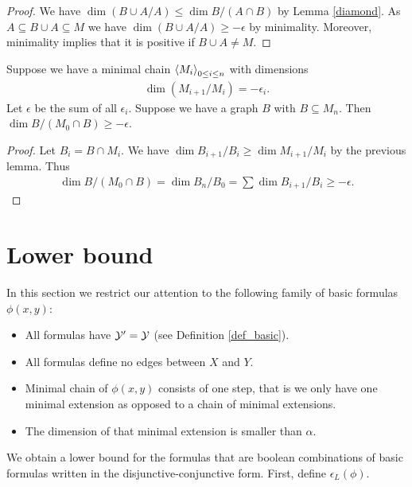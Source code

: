 \documentclass{amsart}
\begin{document}
\begin{proof}
  We have $\dim (B \cup A / A) \leq \dim B / (A \cap B)$ by Lemma \ref{diamond}.
  As $A \subseteq B \cup A \subseteq M$ we have $\dim (B \cup A / A) \geq -\epsilon$ by minimality.
  Moreover, minimality implies that it is positive if $B \cup A \neq M$.
\end{proof}

\begin{Lemma} \label{chain_intersect}
  Suppose we have a minimal chain  $\left\langle M_i \right\rangle_{0 \leq i \leq n}$ with dimensions
  \begin{align*}
    \dim(M_{i+1}/M_i) = -\epsilon_i.
  \end{align*}
  Let $\epsilon$ be the sum of all $\epsilon_i$.
  Suppose we have a graph $B$ with $B \subseteq M_n$.
  Then $\dim B / (M_0 \cap B) \geq -\epsilon$.
\end{Lemma}

\begin{proof}
  Let $B_i = B \cap M_i$.
  We have $\dim B_{i+1}/B_i \geq \dim M_{i+1}/M_i$ by the previous lemma.
  Thus
  \begin{align*}
    \dim B / (M_0 \cap B) = \dim B_n / B_0 = \sum \dim B_{i+1}/B_i \geq -\epsilon.
  \end{align*}
\end{proof}

\section{Lower bound}
In this section we restrict our attention to the following family of basic formulas $\phi(x,y)$:
\begin{itemize}
\item All formulas have $\mathcal Y' = \mathcal Y$ (see Definition \ref{def_basic}).
\item All formulas define no edges between $X$ and $Y$.
\item Minimal chain of $\phi(x,y)$ consists of one step, that is we only have one minimal extension as opposed to a chain of minimal extensions.
\item The dimension of that minimal extension is smaller than $\alpha$.
\end{itemize}

We obtain a lower bound for the formulas that are boolean combinations of basic formulas written in the disjunctive-conjunctive form.
First, define $\epsilon_L(\phi)$.
\end{document}
